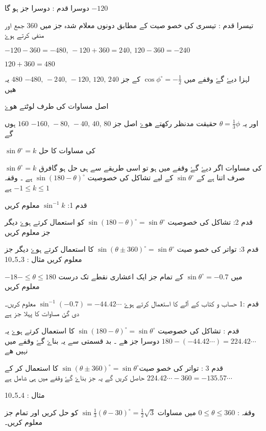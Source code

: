 دوسرا قدم : دوسرا جز ہو گا 
\(-120\)

تیسرا قدم : تیسری کی خصو صیت کے مطابق دونوں معلام شدہ جز  میں \( 360 \) جمع اور منفی کرتے ہوۓ 

\( -120-360=-480, \, -120+360=240,\,120-360=-240 \) 

\( 120+360=480 \) 


لہزا دیۓ گۓ وقفے میں \( \cos \phi^{\circ} = -\frac{1}{2} \) کے جز \( -480,\,-240,\,-120,\,120,\,240 \) 	\( 480 \) 
 یہ ھیں

اصل مساوات کی طرف لوٹتے ھوۓ

اور یہ \( \theta = \frac{1}{3}\phi \)  حقیقت مدنظر رکھتے ھوۓ اصل جز \( -160,\,-80,\,-40,\,40,\,80 \) \( 160 \) ہوں گے

\( \sin\theta^{\circ}=k \) 
  کی مساوات کا حل 

 \( \sin\theta^{\circ}=k \) 
کی مساوات اگر دیۓ گۓ وقفے میں ہو تو اسی طریقے سے ہی حل ہو گافرق صرف اتنا ہے کے  \( \sin\theta^{\circ} \)  کے لیے تشاکل کی خصوصیت \( \sin\left(180-\theta\right)^{\circ} \) ہے ۔ وقفہ \( -1\leqslant k \leqslant1 \) 
 ہے

قدم 1:  \( \sin^{-1}k \) معلوم کریں

قدم 2:  تشاکل کی خصوصیت \( \sin\left(180-\theta\right)^{\circ}=\sin\theta^{\circ} \)  کو استعمال کرتے ہوۓ دیگر جز معلوم کریں
   
قدم 3: تواتر کی خصو صیت \(\sin\left(\theta\pm360\right)^{\circ}=\sin\theta^{\circ} \) 
 کا استعمال کرتے ہوۓ دیگر جز معلوم کریں
مثال  : 3۔5۔10

 \( -18-\leqslant\theta\leqslant180 \) میں \( \sin\theta^{\circ}=-0.7 \) کے تمام جز ایک اعشاری نقطے تک درست معلوم کریں 

قدم :1 حساب و کتاب کے آلے کا استعمال کرتے ہوۓ \( \sin^{-1}\left(-0.7\right)=-44.42\cdots \) معلوم کریں۔ دی گئ مساوات کا پہلا جز ہے  

قدم : تشاکل کی خصوصیت \( \sin\left(180-\theta\right)^{\circ}=\sin\theta^{\circ} \) کا استعمال کرتے ہوۓ  یہ \( 180-\left(-44.42\cdots\right)=224.42\cdots \) دوسرا جز ھے ۔ بد قسمتی سے یہ بناۓ گۓ وقفے میں نہیں ھے

قدم 3 : تواتر کی خصو صیت\( \sin(\theta\pm360)^{\circ}=\sin\theta^{\circ} \)  کا استعمال کر کے \( 224.42\cdots-360=-135.57\cdots \) حاصل کریں گے یہ جز بناۓ گۓ وقفے میں ہی شامل ہے

مثال : 4۔5۔10

وقفہ : \( 0\leqslant\theta\leqslant360 \) میں مساوات \( \sin\frac{1}{3}\left(\theta-30\right)^{\circ}=\frac{1}{2}\sqrt{3} \) کو حل کریں اور تمام جز معلوم کریں۔

